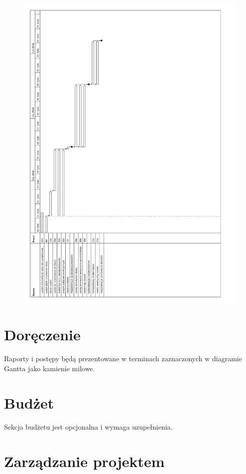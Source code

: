 \documentclass[a4paper]{article}
\begin{document}
        \begin{figure}
            \centering
            \includegraphics[scale=0.7]{gantt}
            \label{fig:my_label}
        \end{figure}
        
\section{Doręczenie}
    Raporty i postępy będą prezentowane w terminach zaznaczonych w diagramie Gantta jako kamienie milowe.
\section{Budżet}
    Sekcja budżetu jest opcjonalna i wymaga uzupełnienia.
\section{Zarządzanie projektem}
\end{document}
